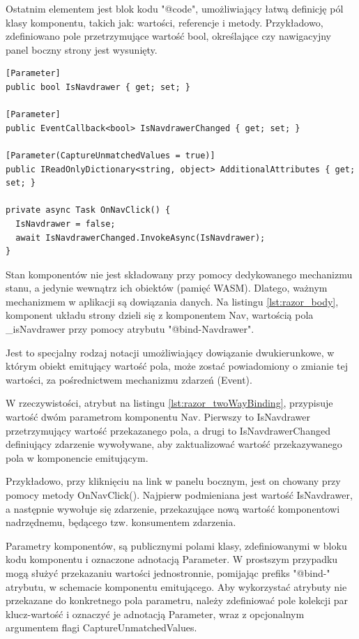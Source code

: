 Ostatnim elementem jest blok kodu "@code", umożliwiający łatwą definicję pól klasy komponentu, takich jak: wartości, referencje i metody. Przykładowo, zdefiniowano pole przetrzymujące wartość bool, określające czy nawigacyjny panel boczny strony jest wysunięty.

\begin{lstlisting}[language=CSharp, caption={Fragment bloku kodu komponentu Nav, poświęcony dwustronnemu wiązaniu danych}, label=lst:razor_twoWayBinding]
[Parameter]
public bool IsNavdrawer { get; set; }

[Parameter]
public EventCallback<bool> IsNavdrawerChanged { get; set; }

[Parameter(CaptureUnmatchedValues = true)]
public IReadOnlyDictionary<string, object> AdditionalAttributes { get; set; }

private async Task OnNavClick() {
  IsNavdrawer = false;
  await IsNavdrawerChanged.InvokeAsync(IsNavdrawer);
}
\end{lstlisting}

Stan komponentów nie jest składowany przy pomocy dedykowanego mechanizmu stanu, a jedynie wewnątrz ich obiektów (pamięć WASM). Dlatego, ważnym mechanizmem w aplikacji są dowiązania danych. Na listingu \ref{lst:razor_body}, komponent układu strony dzieli się z komponentem Nav, wartością pola \_isNavdrawer przy pomocy atrybutu "@bind-Navdrawer".

Jest to specjalny rodzaj notacji umożliwiający dowiązanie dwukierunkowe, w którym obiekt emitujący wartość pola, może zostać powiadomiony o zmianie tej wartości, za pośrednictwem mechanizmu zdarzeń (Event).

W rzeczywistości,  atrybut na listingu \ref{lst:razor_twoWayBinding}, przypisuje wartość dwóm parametrom komponentu Nav. Pierwszy to IsNavdrawer przetrzymujący wartość przekazanego pola, a drugi to IsNavdrawerChanged definiujący zdarzenie wywoływane, aby zaktualizować wartość przekazywanego pola w komponencie emitującym.

Przykładowo, przy kliknięciu na link w panelu bocznym, jest on chowany przy pomocy metody OnNavClick(). Najpierw podmieniana jest wartość IsNavdrawer, a następnie wywołuje się zdarzenie, przekazujące nową wartość komponentowi nadrzędnemu, będącego tzw. konsumentem zdarzenia.

Parametry komponentów, są publicznymi polami klasy, zdefiniowanymi w bloku kodu komponentu i oznaczone adnotacją Parameter. W prostszym przypadku mogą służyć przekazaniu wartości jednostronnie, pomijając prefiks "@bind-" atrybutu, w schemacie komponentu emitującego. Aby wykorzystać atrybuty nie przekazane do konkretnego pola parametru, należy zdefiniować pole kolekcji par klucz-wartość i oznaczyć je adnotacją Parameter, wraz z opcjonalnym argumentem flagi CaptureUnmatchedValues.

